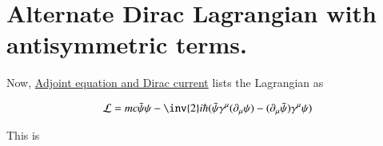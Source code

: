 \documentclass{article}
\begin{document}
\section{ Alternate Dirac Lagrangian with antisymmetric terms. }

Now, 
\href{http://en.wikipedia.org/wiki/Dirac_equation#Adjoint_equation_and_Dirac_current}{Adjoint equation and Dirac current} lists the Lagrangian as

\begin{align*}
\LL = mc \bar{\psi}\psi - {\inv{2}i\hbar}(\bar{\psi}\gamma^\mu (\partial_\mu\psi) - (\partial_\mu\bar{\psi})\gamma^\mu \psi)
\end{align*}

This is 

%
%
\end{document}
